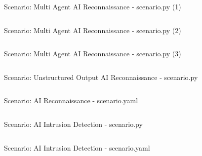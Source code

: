 \begin{listing}[H]
    \inputminted[firstline=18, lastline=83]{python}{../../../lib/scenarios/ai_reconnaissance_multi_agent/scenario.py}
    \caption{Scenario: Multi Agent AI Reconnaissance - scenario.py (1)}
    \label{lst:scenario-ai-recon-multi-agent-py}
\end{listing}

\begin{listing}[H]
    \inputminted[firstline=86, lastline=144]{python}{../../../lib/scenarios/ai_reconnaissance_multi_agent/scenario.py}
    \caption{Scenario: Multi Agent AI Reconnaissance - scenario.py (2)}
    \label{lst:scenario-ai-recon-multi-agent-py-continued-1}
\end{listing}

\begin{listing}[H]
    \inputminted[firstline=147, lastline=196]{python}{../../../lib/scenarios/ai_reconnaissance_multi_agent/scenario.py}
    \caption{Scenario: Multi Agent AI Reconnaissance - scenario.py (3)}
    \label{lst:scenario-ai-recon-multi-agent-py-continued-2}
\end{listing}

\begin{listing}[H]
    \inputminted[firstline=15, lastline=76]{python}{../../../lib/scenarios/ai_reconnaissance_unstructured_output/scenario.py}
    \caption{Scenario: Unstructured Output AI Reconnaissance - scenario.py}
    \label{lst:scenario-ai-recon-unstructured-output-py}
\end{listing}

\begin{listing}[H]
    \inputminted{yaml}{../../../lib/scenarios/ai_reconnaissance/scenario.yaml}
    \caption{Scenario: AI Reconnaissance - scenario.yaml}
    \label{lst:scenario-ai-recon-yaml}
\end{listing}

\begin{listing}[H]
    \inputminted[firstline=14]{python}{../../../lib/scenarios/ai_intrusion_detection/scenario.py}
    \caption{Scenario: AI Intrusion Detection - scenario.py}
    \label{lst:scenario-ai-ids-py}
\end{listing}

\begin{listing}[H]
    \inputminted{yaml}{../../../lib/scenarios/ai_intrusion_detection/scenario.yaml}
    \caption{Scenario: AI Intrusion Detection - scenario.yaml}
    \label{lst:scenario-ai-ids-yaml}
\end{listing}
